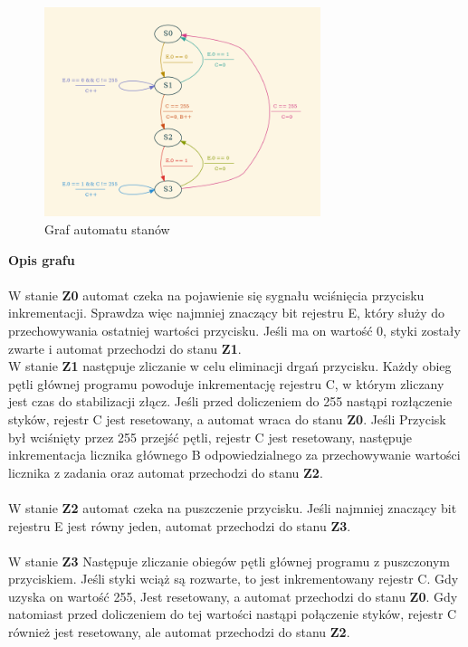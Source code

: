 \documentclass[fleqn]{article}
\begin{document}
\begin{figure}[H]
	\centering
	\includegraphics[width=0.72\textwidth]{img/graph.png}
	\caption{Graf automatu stanów}
	\label{fig:graph}
\end{figure}

\textbf{Opis grafu} \\
\\
 W stanie \textbf{Z0} automat czeka na pojawienie się sygnału wciśnięcia przycisku inkrementacji. Sprawdza więc najmniej znaczący bit rejestru E, który służy do przechowywania ostatniej wartości przycisku. Jeśli ma on wartość 0, styki zostały zwarte i automat przechodzi do stanu \textbf{Z1}.\\
 W stanie \textbf{Z1} następuje zliczanie w celu eliminacji drgań przycisku. Każdy obieg pętli głównej programu powoduje inkrementację rejestru C, w którym zliczany jest czas do stabilizacji złącz. Jeśli przed doliczeniem do 255 nastąpi rozłączenie styków, rejestr C jest resetowany, a automat wraca do stanu \textbf{Z0}. Jeśli Przycisk był wciśnięty przez 255 przejść pętli, rejestr C jest resetowany, następuje inkrementacja licznika głównego B odpowiedzialnego za przechowywanie wartości licznika z zadania oraz automat przechodzi do stanu \textbf{Z2}.\\ \\
W stanie \textbf{Z2} automat czeka na puszczenie przycisku. Jeśli najmniej znaczący bit rejestru E jest równy jeden, automat przechodzi do stanu \textbf{Z3}.\\ \\
W stanie \textbf{Z3} Następuje zliczanie obiegów pętli głównej programu z puszczonym przyciskiem. Jeśli styki wciąż są rozwarte, to jest inkrementowany rejestr C. Gdy uzyska on wartość 255, Jest resetowany, a automat przechodzi do stanu \textbf{Z0}. Gdy natomiast przed doliczeniem do tej wartości nastąpi połączenie styków, rejestr C również jest resetowany, ale automat przechodzi do stanu \textbf{Z2}.
\end{document}
